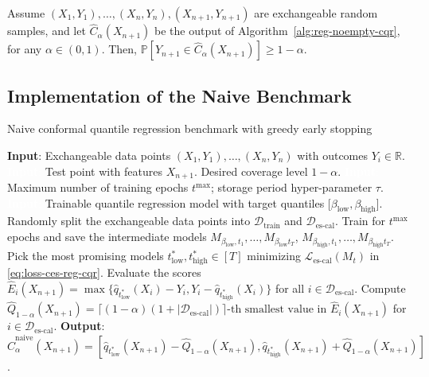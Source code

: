 \begin{corollary}\label{thm:reg-noempty-cqr}
Assume $(X_{1},Y_{1}), \ldots, (X_{n},Y_{n}), (X_{n+1},Y_{n+1})$ are exchangeable random samples, and let $\hat{C}_{\alpha}(X_{n+1})$ be the output of Algorithm~\ref{alg:reg-noempty-cqr}, for any $\alpha \in (0,1)$. 
Then, $\mathbb{P}[Y_{n+1} \in \hat{C}_{\alpha}(X_{n+1})] \geq 1-\alpha$.
\end{corollary}


\subsection{Implementation of the Naive Benchmark}  \label{app:naive-benchmarks-details-cqr}

\begin{algorithm}[H]
    \caption{Naive conformal quantile regression benchmark with greedy early stopping}
    \label{alg:naive-reg-cqr}
    \begin{algorithmic}[1]
        \STATE \textbf{Input}: Exchangeable data points $(X_{1},Y_{1}), \ldots, (X_{n},Y_{n})$ with outcomes $Y_i \in \mathbb{R}$.
        \STATE \textcolor{white}{\textbf{Input}:} Test point with features $X_{n+1}$. Desired coverage level $1-\alpha$.
        \STATE \textcolor{white}{\textbf{Input}:} Maximum number of training epochs $t^{\text{max}}$; storage period hyper-parameter $\tau$.
        \STATE \textcolor{white}{\textbf{Input}:} Trainable quantile regression model with target quantiles [$\beta_{\text{low}}, \beta_{\text{high}}$]. 
        \STATE Randomly split the exchangeable data points into $\mathcal{D}_{\text{train}}$ and $\mathcal{D}_{\text{es-cal}}$.
        \STATE Train for $t^{\text{max}}$ epochs and save the intermediate models $M_{\beta_{\text{low}},t_1} , \dots, M_{\beta_{\text{low}}t_T}$,  $M_{\beta_{\text{high}},t_1} , \dots, M_{\beta_{\text{high}}t_T}$.
        \STATE Pick the most promising models $t^*_{\text{low}}, t^*_{\text{high}}\in [T]$ minimizing $\mathcal{L}_{\text{es-cal}}(M_t)$ in \eqref{eq:loss-ces-reg-cqr}.
        \STATE Evaluate the scores $\hat{E}_i(X_{n+1}) = \max\{\hat{q}_{t^*_{\text{low}}}(X_i) - Y_i, Y_i -\hat{q}_{t^*_{\text{high}}}(X_i)\}$ for all $i \in \mathcal{D}_{\text{es-cal}}$.
        \STATE Compute $\hat{Q}_{1-\alpha}(X_{n+1}) = \lceil (1-\alpha)(1+|\mathcal{D}_{\text{es-cal}}|) \rceil\text{-th smallest value in }
        \hat{E}_i(X_{n+1})$ for $i \in \mathcal{D}_{\text{es-cal}}$.
        \STATE \textbf{Output}: $\hat{C}^{\text{naive}}_{\alpha}(X_{n+1}) = [\hat{q}_{t^*_{\text{low}}}(X_{n+1}) - \hat{Q}_{1-\alpha}(X_{n+1}), \hat{q}_{t^*_{\text{high}}}(X_{n+1}) + \hat{Q}_{1-\alpha}(X_{n+1})]$.
    \end{algorithmic}
\end{algorithm}

